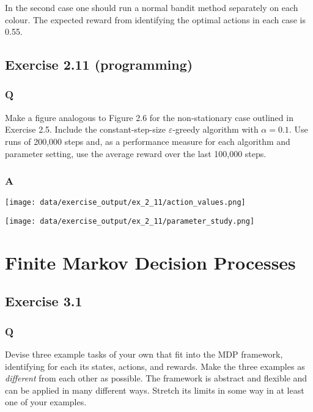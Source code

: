 In the second case one should run a normal bandit method separately on each colour. The expected reward from identifying the optimal actions in each case is 0.55.

\subsection{Exercise 2.11 (programming)}
\subsubsection{Q}
Make a figure analogous to Figure 2.6 for the non-stationary case outlined in Exercise 2.5. Include the constant-step-size $\varepsilon$-greedy algorithm with $\alpha=0.1$. Use runs of 200,000 steps and, as a performance measure for each algorithm and parameter setting, use the average reward over the last 100,000 steps.

\subsubsection{A}
\ProgrammingExercise

\texttt{[image: data/exercise\_output/ex\_2\_11/action\_values.png]}

\texttt{[image: data/exercise\_output/ex\_2\_11/parameter\_study.png]}


\section{Finite Markov Decision Processes}

\subsection{Exercise 3.1}
\subsubsection{Q}
Devise three example tasks of your own that fit into the MDP framework, identifying for each its states, actions, and rewards. Make the three examples as \emph{different} from each other as possible. The framework is abstract and flexible and can be applied in many different ways. Stretch its limits in some way in at least one of your examples.

